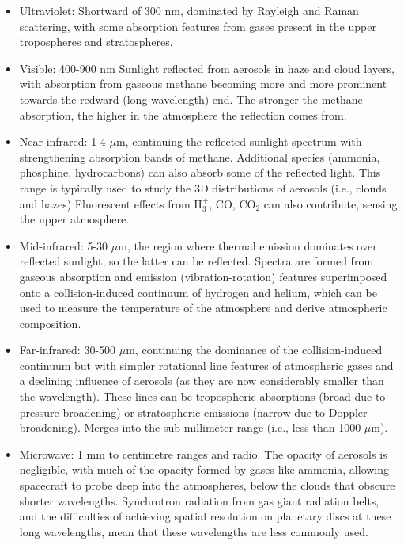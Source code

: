 \documentclass[final,5p,times,twocolumn,authoryear]{elsarticle}
\begin{document}
\begin{itemize}
    \item Ultraviolet:  Shortward of 300 nm, dominated by Rayleigh and Raman scattering, with some absorption features from gases present in the upper tropospheres and stratospheres.
    \item Visible: 400-900 nm Sunlight reflected from aerosols in haze and cloud layers, with absorption from gaseous methane becoming more and more prominent towards the redward (long-wavelength) end. The stronger the methane absorption, the higher in the atmosphere the reflection comes from.
    \item Near-infrared:  1-4 $\mu$m, continuing the reflected sunlight spectrum with strengthening absorption bands of methane.  Additional species (ammonia, phosphine, hydrocarbons) can also absorb some of the reflected light.  This range is typically used to study the 3D distributions of aerosols (i.e., clouds and hazes)  Fluorescent effects from H$_3^+$, CO, CO$_2$ can also contribute, sensing the upper atmosphere.
    \item Mid-infrared:  5-30 $\mu$m, the region where thermal emission dominates over reflected sunlight, so the latter can be reflected.  Spectra are formed from gaseous absorption and emission (vibration-rotation) features superimposed onto a collision-induced continuum of hydrogen and helium, which can be used to measure the temperature of the atmosphere and derive atmospheric composition.
    \item Far-infrared:  30-500 $\mu$m, continuing the dominance of the collision-induced continuum but with simpler rotational line features of atmospheric gases and a declining influence of aerosols (as they are now considerably smaller than the wavelength).  These lines can be tropospheric absorptions (broad due to pressure broadening) or stratospheric emissions (narrow due to Doppler broadening).  Merges into the sub-millimeter range (i.e., less than 1000 $\mu$m).  
    \item Microwave:  1 mm to centimetre ranges and radio.  The opacity of aerosols is negligible, with much of the opacity formed by gases like ammonia, allowing spacecraft to probe deep into the atmospheres, below the clouds that obscure shorter wavelengths.  Synchrotron radiation from gas giant radiation belts, and the difficulties of achieving spatial resolution on planetary discs at these long wavelengths, mean that these wavelengths are less commonly used.
\end{itemize}
\end{document}
